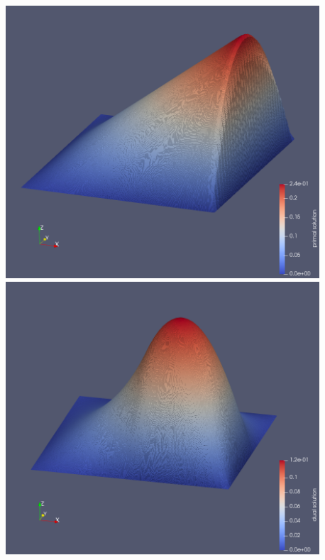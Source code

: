 \newpage
\begin{appendices}
\lhead{}

\section{}\label{SolnFigures}

{\centering
\null\vfill
\includegraphics[width=6in, height=4in]{../fenics/images/uh.png}
\vfill
\includegraphics[width=6in, height=4in]{../fenics/images/zh.png}
\vfill
}
\end{appendices}
